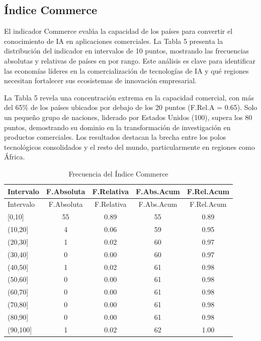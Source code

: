 \documentclass[
]{article}
\begin{document}
\begin{multicols}{2}

\subsection{Índice Commerce}

El indicador Commerce evalúa la capacidad de los países para convertir el conocimiento de IA en aplicaciones comerciales. La Tabla 5 presenta la distribución del indicador en intervalos de 10 puntos, mostrando las frecuencias absolutas y relativas de países en por rango. Este análisis es clave para identificar las economías líderes en la comercialización de tecnologías de IA y qué regiones necesitan fortalecer sus ecosistemas de innovación empresarial.

La Tabla 5 revela una concentración extrema en la capacidad comercial, con más del 65\% de los países ubicados por debajo de los 20 puntos (F.Rel.A = 0.65). Solo un pequeño grupo de naciones, liderado por Estados Unidos (100), supera los 80 puntos, demostrando su dominio en la transformación de investigación en productos comerciales. Los resultados destacan la brecha entre los polos tecnológicos consolidados y el resto del mundo, particularmente en regiones como África.

\end{multicols}

\begin{longtable}[]{@{}lcccc@{}}
\caption{Frecuencia del Índice Commerce}\tabularnewline
\toprule\noalign{}
Intervalo & F.Absoluta & F.Relativa & F.Abs.Acum & F.Rel.Acum \\
\midrule\noalign{}
\endfirsthead
\toprule\noalign{}
Intervalo & F.Absoluta & F.Relativa & F.Abs.Acum & F.Rel.Acum \\
\midrule\noalign{}
\endhead
\bottomrule\noalign{}
\endlastfoot
{[}0,10{]} & 55 & 0.89 & 55 & 0.89 \\
(10,20{]} & 4 & 0.06 & 59 & 0.95 \\
(20,30{]} & 1 & 0.02 & 60 & 0.97 \\
(30,40{]} & 0 & 0.00 & 60 & 0.97 \\
(40,50{]} & 1 & 0.02 & 61 & 0.98 \\
(50,60{]} & 0 & 0.00 & 61 & 0.98 \\
(60,70{]} & 0 & 0.00 & 61 & 0.98 \\
(70,80{]} & 0 & 0.00 & 61 & 0.98 \\
(80,90{]} & 0 & 0.00 & 61 & 0.98 \\
(90,100{]} & 1 & 0.02 & 62 & 1.00 \\
\end{longtable}
\end{document}
